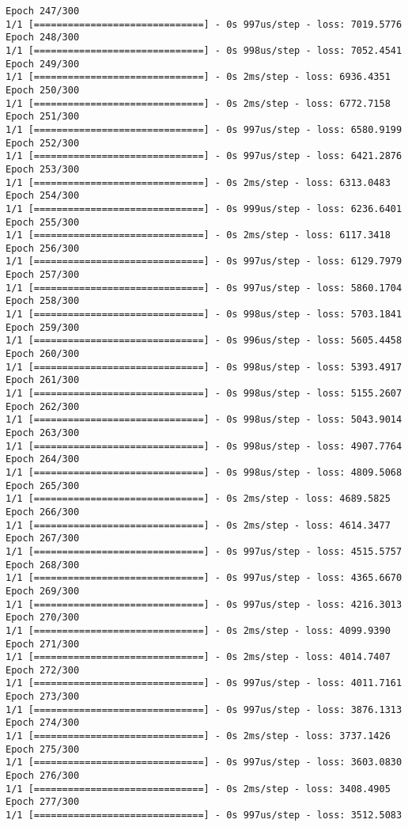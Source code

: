 \documentclass[11pt]{article}
\begin{document}
\begin{Verbatim}[commandchars=\\\{\}]
Epoch 247/300
1/1 [==============================] - 0s 997us/step - loss: 7019.5776
Epoch 248/300
1/1 [==============================] - 0s 998us/step - loss: 7052.4541
Epoch 249/300
1/1 [==============================] - 0s 2ms/step - loss: 6936.4351
Epoch 250/300
1/1 [==============================] - 0s 2ms/step - loss: 6772.7158
Epoch 251/300
1/1 [==============================] - 0s 997us/step - loss: 6580.9199
Epoch 252/300
1/1 [==============================] - 0s 997us/step - loss: 6421.2876
Epoch 253/300
1/1 [==============================] - 0s 2ms/step - loss: 6313.0483
Epoch 254/300
1/1 [==============================] - 0s 999us/step - loss: 6236.6401
Epoch 255/300
1/1 [==============================] - 0s 2ms/step - loss: 6117.3418
Epoch 256/300
1/1 [==============================] - 0s 997us/step - loss: 6129.7979
Epoch 257/300
1/1 [==============================] - 0s 997us/step - loss: 5860.1704
Epoch 258/300
1/1 [==============================] - 0s 998us/step - loss: 5703.1841
Epoch 259/300
1/1 [==============================] - 0s 996us/step - loss: 5605.4458
Epoch 260/300
1/1 [==============================] - 0s 998us/step - loss: 5393.4917
Epoch 261/300
1/1 [==============================] - 0s 998us/step - loss: 5155.2607
Epoch 262/300
1/1 [==============================] - 0s 998us/step - loss: 5043.9014
Epoch 263/300
1/1 [==============================] - 0s 998us/step - loss: 4907.7764
Epoch 264/300
1/1 [==============================] - 0s 998us/step - loss: 4809.5068
Epoch 265/300
1/1 [==============================] - 0s 2ms/step - loss: 4689.5825
Epoch 266/300
1/1 [==============================] - 0s 2ms/step - loss: 4614.3477
Epoch 267/300
1/1 [==============================] - 0s 997us/step - loss: 4515.5757
Epoch 268/300
1/1 [==============================] - 0s 997us/step - loss: 4365.6670
Epoch 269/300
1/1 [==============================] - 0s 997us/step - loss: 4216.3013
Epoch 270/300
1/1 [==============================] - 0s 2ms/step - loss: 4099.9390
Epoch 271/300
1/1 [==============================] - 0s 2ms/step - loss: 4014.7407
Epoch 272/300
1/1 [==============================] - 0s 997us/step - loss: 4011.7161
Epoch 273/300
1/1 [==============================] - 0s 997us/step - loss: 3876.1313
Epoch 274/300
1/1 [==============================] - 0s 2ms/step - loss: 3737.1426
Epoch 275/300
1/1 [==============================] - 0s 997us/step - loss: 3603.0830
Epoch 276/300
1/1 [==============================] - 0s 2ms/step - loss: 3408.4905
Epoch 277/300
1/1 [==============================] - 0s 997us/step - loss: 3512.5083

\end{Verbatim}
\end{document}
